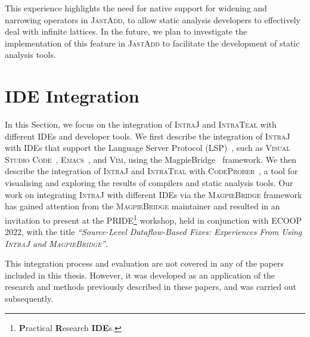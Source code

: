 This experience highlights the need for native support for widening and narrowing
operators in \textsc{JastAdd}, to allow static analysis developers to effectively deal with
infinite lattices. In the future, we plan to investigate the implementation of this
feature in \textsc{JastAdd} to facilitate the development of static analysis tools.


\section{IDE Integration}
\label{sec:IDEIntegration}
In this Section, we focus on the integration of \textsc{IntraJ} and \textsc{IntraTeal} with different
IDEs and developer tools. We first describe the integration of \textsc{IntraJ} with
IDEs that support the Language Server Protocol (LSP)~\cite{Microsoftlsp}, such as
\textsc{Visual Studio Code}~\cite{Microsoftvscode}, \textsc{Emacs}~\cite{emacs}, and \textsc{Vim}\cite{vim}, using
the MagpieBridge~\cite{luo_et_al:LIPIcs:2019:10813} framework. We then describe the
integration of \textsc{IntraJ} and \textsc{IntraTeal} with \textsc{CodeProber}~\cite{risberg2022property},
a tool for visualising and exploring the results of compilers and static analysis tools.
Our work on integrating \textsc{IntraJ} with different IDEs via the \textsc{MagpieBridge}
framework has gained attention from the \textsc{MagpieBridge} maintainer and resulted in an invitation
to present at the \textsc{PRIDE}\footnote{\textbf{P}ractical \textbf{R}esearch \textbf{IDE}s.} workshop, held in conjunction with \textsc{ECOOP 2022}, with the
title \emph{``Source-Level Dataflow-Based Fixes: Experiences From Using \textsc{IntraJ} and \textsc{MagpieBridge}''}.

This integration process and evaluation are not covered in any of the papers included in this thesis.
However, it was developed as an application of the research and methods previously
described in these papers, and was carried out subsequently.

